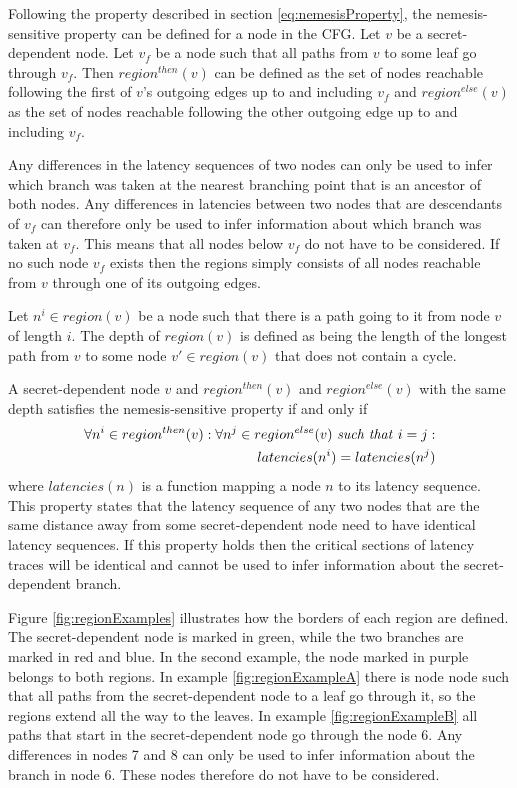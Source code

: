 Following the property described in section \ref{eq:nemesisProperty}, the nemesis-sensitive property can be defined for a node in the CFG. Let $v$ be a secret-dependent node. 
Let $v_f$ be a node such that all paths from $v$ to some leaf go through $v_f$. Then $region^{then}(v)$ can be defined as the set of nodes reachable following the 
first of $v$'s outgoing edges up to and including $v_f$ and $region^{else}(v)$ as the set of nodes reachable following the other outgoing edge up to and including $v_f$.

Any differences in the latency sequences of two nodes can only be used to infer which branch was taken at the nearest branching point that is an ancestor of both nodes. 
Any differences in latencies between two nodes that are descendants of $v_f$ can therefore only be used to infer information about which branch was taken at $v_f$. 
This means that all nodes below $v_f$ do not have to be considered. If no such node $v_f$ exists then the regions simply consists of all nodes reachable from $v$ through one of its outgoing edges. 

Let $n^i \in region(v)$ be a node such that there is a path going to it from node $v$ of length $i$. The depth of $region(v)$ is defined as being the length of the longest path from $v$ to some node $v' \in region(v)$ that does not contain a cycle.

A secret-dependent node $v$ and $region^{then}(v)$ and $region^{else}(v)$ with the same depth satisfies the nemesis-sensitive property if and only if 
\begin{equation} \label{eq:nemesisPropertyNode}
    \begin{split}
    \forall n^i \in region^{then}(v) : \forall n^j \in region^{else}(v) \text{ \textit{such that} } i=j :  \\ 
    latencies(n^i) = latencies(n^j)
    \end{split}
\end{equation}
where $latencies(n)$ is a function mapping a node $n$ to its latency sequence. This property states that the latency sequence of any two nodes that are the same distance away 
from some secret-dependent node need to have identical latency sequences. If this property holds then the critical sections of latency traces will be identical and cannot be used to 
infer information about the secret-dependent branch. 

Figure \ref{fig:regionExamples} illustrates how the borders of each region are defined. The secret-dependent node is marked in green, while the two branches are marked in red and blue. In the second example, the node marked in purple belongs to both regions. In example \ref{fig:regionExampleA} there is node node such that all paths from the secret-dependent node to a leaf go through it, so the regions extend all the way to the leaves. In example \ref{fig:regionExampleB} all paths that start in the secret-dependent node go through the node 6. Any differences in nodes 7 and 8 can only be used to infer information about the branch in node 6. These nodes therefore do not have to be considered.  


